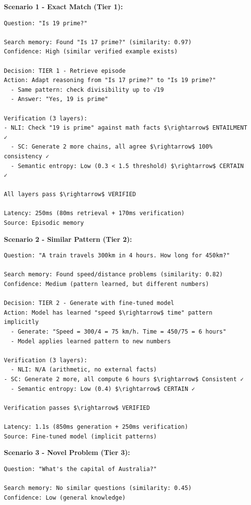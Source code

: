 \documentclass[12pt,a4paper]{article}
\theoremstyle{definition}
\begin{document}
\begin{examplebox}[title=How CAEM Decides What To Do]

\textbf{Scenario 1 - Exact Match (Tier 1):}
\begin{verbatim}
Question: "Is 19 prime?"

Search memory: Found "Is 17 prime?" (similarity: 0.97)
Confidence: High (similar verified example exists)

Decision: TIER 1 - Retrieve episode
Action: Adapt reasoning from "Is 17 prime?" to "Is 19 prime?"
  - Same pattern: check divisibility up to √19
  - Answer: "Yes, 19 is prime"

Verification (3 layers):
- NLI: Check "19 is prime" against math facts $\rightarrow$ ENTAILMENT ✓
  - SC: Generate 2 more chains, all agree $\rightarrow$ 100% consistency ✓
  - Semantic entropy: Low (0.3 < 1.5 threshold) $\rightarrow$ CERTAIN ✓

All layers pass $\rightarrow$ VERIFIED
  
Latency: 250ms (80ms retrieval + 170ms verification)
Source: Episodic memory
\end{verbatim}

\textbf{Scenario 2 - Similar Pattern (Tier 2):}
\begin{verbatim}
Question: "A train travels 300km in 4 hours. How long for 450km?"

Search memory: Found speed/distance problems (similarity: 0.82)
Confidence: Medium (pattern learned, but different numbers)

Decision: TIER 2 - Generate with fine-tuned model
Action: Model has learned "speed $\rightarrow$ time" pattern implicitly
  - Generate: "Speed = 300/4 = 75 km/h. Time = 450/75 = 6 hours"
  - Model applies learned pattern to new numbers

Verification (3 layers):
  - NLI: N/A (arithmetic, no external facts)
- SC: Generate 2 more, all compute 6 hours $\rightarrow$ Consistent ✓
  - Semantic entropy: Low (0.4) $\rightarrow$ CERTAIN ✓

Verification passes $\rightarrow$ VERIFIED
  
Latency: 1.1s (850ms generation + 250ms verification)
Source: Fine-tuned model (implicit patterns)
\end{verbatim}

\textbf{Scenario 3 - Novel Problem (Tier 3):}
\begin{verbatim}
Question: "What's the capital of Australia?"

Search memory: No similar questions (similarity: 0.45)
Confidence: Low (general knowledge)


\end{verbatim}
\end{examplebox}
\end{document}
